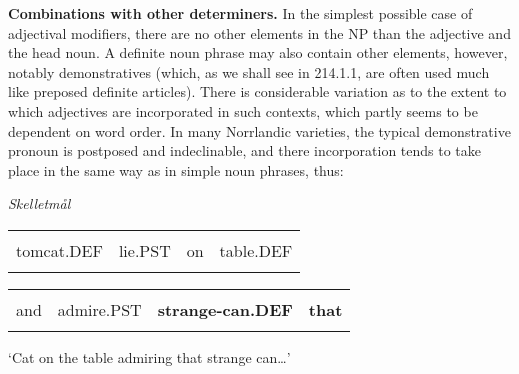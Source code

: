 \begin{styleBodytextC}
\textbf{Combinations with other determiners. }In the simplest possible case of adjectival modifiers, there are no other elements in the NP than the adjective and the head noun. A definite noun phrase may also contain other elements, however, notably demonstratives (which, as we shall see in 214.1.1, are often used much like preposed definite articles). There is considerable variation as to the extent to which adjectives are incorporated in such contexts, which partly seems to be dependent on word order. In many Norrlandic varieties, the typical demonstrative pronoun is postposed and indeclinable, and there incorporation tends to take place in the same way as in simple noun phrases, thus:

\end{styleBodytextC}

\begin{listWWNumileveli}
\item {}

\begin{styleExample}\itshape
Skelletmål

\end{styleExample}

\end{listWWNumileveli}

\begin{tabular}{llll}
\lsptoprule
\multicolumn{4}{l}{Kattkalln

}\\
tomcat.DEF & lie.PST & on & table.DEF\\
\lspbottomrule
\end{tabular}

\begin{tabular}{llll}
\lsptoprule
\multicolumn{4}{l}{å

}\\
and & admire.PST & {\bfseries strange-can.DEF} & {\bfseries that}\\
\lspbottomrule
\end{tabular}

\begin{styleTranslation}
‘Cat on the table admiring that strange can…’

\end{styleTranslation}

